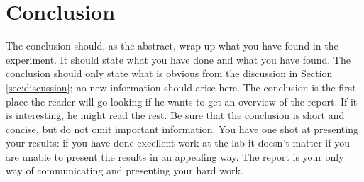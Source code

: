 \section{Conclusion}
\label{sec:conclusion}
The conclusion should, as the abstract, wrap up what you have found in the experiment. It should state what you have done and what you have found. The conclusion should only state what is obvious from the discussion in Section \ref{sec:discussion}; no new information should arise here. The conclusion is the first place the reader will go looking if he wants to get an overview of the report. If it is interesting, he might read the rest. Be sure that the conclusion is short and concise, but do not omit important information. You have one shot at presenting your results: if you have done excellent work at the lab it doesn't matter if you are unable to present the results in an appealing way. The report is your only way of communicating and presenting your hard work.